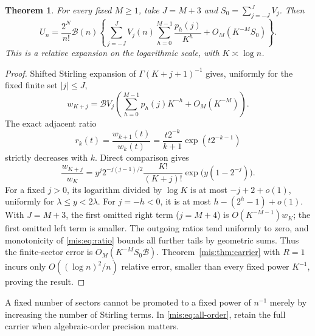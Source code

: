 \documentclass[11pt]{article}
\newtheorem{theorem}{Theorem}[section]
\theoremstyle{remark}\newtheorem{remark}[theorem]{Remark}
\begin{document}
\begin{theorem}\label{mis:thm:sectors}
For every fixed $M\ge1$, take $J=M+3$ and $S_0=\sum_{j=-J}^J V_j$. Then
\begin{equation}\label{mis:eq:sector-expansion}
 U_n=\frac{2^N}{n!}\mathcal B(n)
 \left\{\sum_{j=-J}^J V_j(n)\sum_{h=0}^{M-1}\frac{p_h(j)}{K^h}
           +O_M(K^{-M}S_0)\right\}.
\end{equation}
This is a relative expansion on the logarithmic scale, with $K\asymp\log n$.
\end{theorem}
\begin{proof}
Shifted Stirling expansion of $\Gamma(K+j+1)^{-1}$ gives, uniformly for the fixed finite set $|j|\le J$,
\[
 w_{K+j}=\mathcal B V_j
       \left(\sum_{h=0}^{M-1}p_h(j)K^{-h}+O_M(K^{-M})\right).
\]
The exact adjacent ratio
\begin{equation}\label{mis:eq:ratio}
 r_k(t)=\frac{w_{k+1}(t)}{w_k(t)}
       =\frac{t2^{-k}}{k+1}\exp(t2^{-k-1})
\end{equation}
strictly decreases with $k$. Direct comparison gives
\[
 \frac{w_{K+j}}{w_K}=y^j2^{-j(j-1)/2}\frac{K!}{(K+j)!}
                         \exp\bigl(y(1-2^{-j})\bigr).
\]
For a fixed $j>0$, its logarithm divided by $\log K$ is at most $-j+2+o(1)$, uniformly for $\lambda\le y<2\lambda$. For $j=-h<0$, it is at most $h-(2^h-1)+o(1)$. With $J=M+3$, the first omitted right term ($j=M+4$) is $O(K^{-M-1})w_K$; the first omitted left term is smaller. The outgoing ratios tend uniformly to zero, and monotonicity of \eqref{mis:eq:ratio} bounds all further tails by geometric sums. Thus the finite-sector error is $O_M(K^{-M}S_0\mathcal B)$. Theorem~\ref{mis:thm:carrier} with $R=1$ incurs only $O((\log n)^2/n)$ relative error, smaller than every fixed power $K^{-1}$, proving the result.
\end{proof}
A fixed number of sectors cannot be promoted to a fixed power of $n^{-1}$ merely by increasing the number of Stirling terms. In \eqref{mis:eq:all-order}, retain the full carrier when algebraic-order precision matters.
\end{document}
